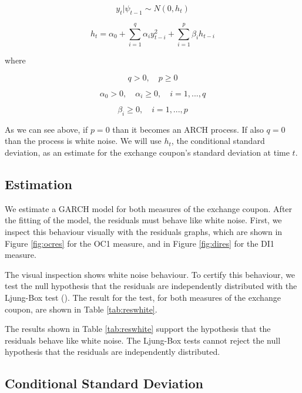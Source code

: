 \documentclass[cic,tc, english]{iiufrgs}
\begin{document}
    \begin{equation}
        \label{eqn:archgarch}
        y_t | \psi_{t-1} \sim N(0,h_t)
    \end{equation}

    \begin{equation}
        \label{eqn:garch}
        h_t = \alpha_0 + \displaystyle\sum_{i=1}^{q} \alpha_i y_{t-i}^2 + \displaystyle\sum_{i=1}^{p} \beta_i h_{t-i}
    \end{equation}

    where

    $$q > 0, \quad   p \geq 0$$

    $$\alpha_0 > 0, \quad  \alpha_i \geq 0, \quad  i=1,...,q$$

    $$\beta_i \geq 0, \quad  i=1,...,p$$

    As we can see above, if $p = 0$ than it becomes an ARCH process. If also $q = 0$ than the process is white noise. We will use $h_t$, the conditional standard deviation, as an estimate for the exchange coupon's standard deviation at time $t$.

\subsection{Estimation} \label{chapter_estimation}

    We estimate a GARCH model for both measures of the exchange coupon. After the fitting of the model, the residuals must behave like white noise. First, we inspect this behaviour visually with the residuals graphs, which are shown in Figure \ref{fig:ocres} for the OC1 measure, and in Figure \ref{fig:dires} for the DI1 measure.

    

    

    The visual inspection shows white noise behaviour. To certify this behaviour, we test the null hypothesis that the residuals are independently distributed with the Ljung-Box test (\citet{ljungbox}). The result for the test, for both measures of the exchange coupon, are shown in Table \ref{tab:reswhite}.

    

    The results shown in Table \ref{tab:reswhite} support the hypothesis that the residuals behave like white noise. The Ljung-Box tests cannot reject the null hypothesis that the residuals are independently distributed.

\subsection{Conditional Standard Deviation}
\end{document}
